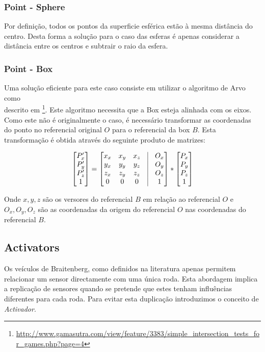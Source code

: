 \documentclass[a4paper]{article}
\begin{document}
\subsubsection{Point - Sphere}
\indent \indent Por definição, todos os pontos da superficie esférica estão à mesma distância do centro.
Desta forma a solução para o caso das esferas é apenas considerar a distância entre os centros e subtrair o raio da esfera.

\subsubsection{Point - Box}
\indent \indent Uma solução eficiente para este caso consiste em utilizar o algoritmo de Arvo como \\ descrito em  \footnote[1]{\url{http://www.gamasutra.com/view/feature/3383/simple_intersection_tests_for_games.php?page=4}}.
Este algoritmo necessita que a Box esteja alinhada com os eixos. Como este não é originalmente o caso, é necessário transformar as coordenadas do ponto no referencial original $O$ para o referencial da box $B$.
Esta transformação é obtida através do seguinte produto de matrizes:

\[
 	\begin{bmatrix}
		P_{x}' \\
		P_{y}' \\
		P_{z}' \\
		1 
	\end{bmatrix}
	=
	\begin{bmatrix}
		x_{x} & x_{y} & x_{z} & \vline & O_{x}	\\
		y_{x} & y_{y} & y_{z} & \vline & O_{y}	\\
		z_{x} & z_{y} & z_{z} & \vline & O_{z}	\\
		0 & 0 & 0 & \vline & 1 	\\
	\end{bmatrix}
	*
 	\begin{bmatrix}
		P_{x} \\
		P_{y} \\
		P_{z} \\
		1 
	\end{bmatrix}
\]

Onde $x, y, z$ são os versores do referencial $B$ em relação ao referencial $O$ e $O_{x}, O_{y}, O_{z}$ são as coordenadas da origem do referencial $O$ nas coordenadas do referencial $B$.

\cleardoublepage
\subsection{Activators}
\indent \indent Os veículos de Braitenberg, como definidos na literatura apenas permitem relacionar um sensor directamente com uma única roda.
Esta abordagem implica a replicação de sensores quando se pretende que estes tenham influências diferentes para cada roda.
Para evitar esta duplicação introduzimos o conceito de \emph{Activador}. 
\end{document}
